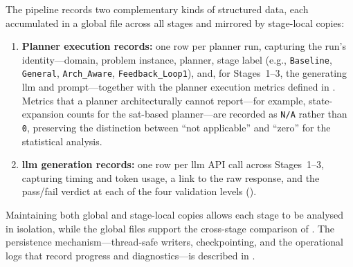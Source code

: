 The pipeline records two complementary kinds of structured data, each accumulated in a global file across all stages and mirrored by stage-local copies:

\begin{enumerate}
  \item \textbf{Planner execution records:} one row per planner run, capturing the run's identity---domain, problem instance, planner, stage label (e.g., \texttt{Baseline}, \texttt{General}, \texttt{Arch\_Aware}, \texttt{Feedback\_Loop1}), and, for Stages~1--3, the generating \gls{llm} and prompt---together with the planner execution metrics defined in .
        Metrics that a planner architecturally cannot report---for example, state-expansion counts for the \gls{sat}-based planner---are recorded as \texttt{N/A} rather than \texttt{0}, preserving the distinction between ``not applicable'' and ``zero'' for the statistical analysis.

  \item \textbf{\gls{llm} generation records:} one row per \gls{llm} API call across Stages~1--3, capturing timing and token usage, a link to the raw response, and the pass/fail verdict at each of the four validation levels ().
\end{enumerate}

Maintaining both global and stage-local copies allows each stage to be analysed in isolation, while the global files support the cross-stage comparison of .
The persistence mechanism---thread-safe writers, checkpointing, and the operational logs that record progress and diagnostics---is described in .

